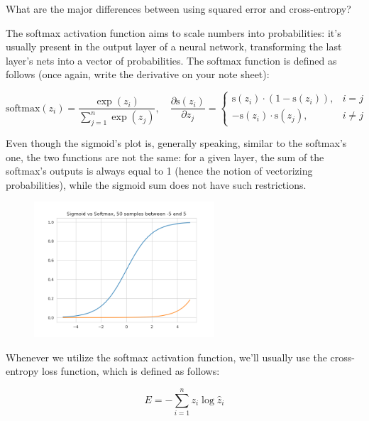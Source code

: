 \documentclass[12pt]{article}
\begin{document}
\begin{enumerate}[leftmargin=\labelsep]
\begin{tcolorbox}[enhanced jigsaw,colback=bg,boxrule=0pt,arc=1pt,halign=center]
    What are the major differences between using squared error and cross-entropy?

  \end{tcolorbox}

  The softmax activation function aims to scale numbers into probabilities: it's usually
  present in the output layer of a neural network, transforming the last layer's nets
  into a vector of probabilities. The softmax function is defined as follows
  (once again, write the derivative on your note sheet):

  \begin{equation*}
    \text{softmax}(z_i) = \frac{\exp(z_i)}{\sum_{j=1}^n \exp(z_j)}, \quad
    \frac{\partial \text{s}(z_i)}{\partial z_j} = \begin{cases}
      \text{s}(z_i) \cdot (1 - \text{s}(z_i)), & i = j    \\
      - \text{s}(z_i) \cdot \text{s}(z_j),     & i \neq j
    \end{cases}
  \end{equation*}

  Even though the sigmoid's plot is, generally speaking, similar to the softmax's one,
  the two functions are not the same: for a given layer, the sum of the softmax's
  outputs is always equal to 1 (hence the notion of vectorizing probabilities), while
  the sigmoid sum does not have such restrictions.

  \begin{figure}[H]
    \centering
    \includegraphics[width=0.6\textwidth]{assets/sigmoid-softmax.png}
  \end{figure}

  Whenever we utilize the softmax activation function, we'll usually use the cross-entropy
  loss function, which is defined as follows:

  \begin{equation*}
    E = - \sum_{i=1}^n z_i \log \hat{z}_i
  \end{equation*}


\end{enumerate}
\end{document}
